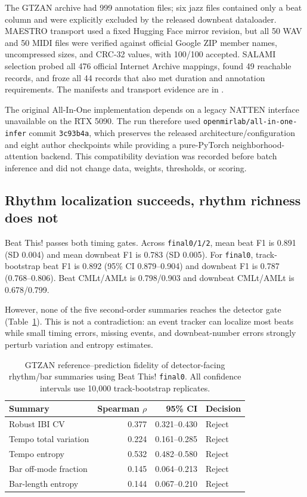 The GTZAN archive had 999 annotation files; six jazz files contained only a beat column and were explicitly excluded by the released downbeat dataloader. MAESTRO transport used a fixed Hugging Face mirror revision, but all 50 WAV and 50 MIDI files were verified against official Google ZIP member names, uncompressed sizes, and CRC-32 values, with 100/100 accepted. SALAMI selection probed all 476 official Internet Archive mappings, found 49 reachable records, and froze all 44 records that also met duration and annotation requirements. The manifests and transport evidence are in .

The original All-In-One implementation depends on a legacy NATTEN interface unavailable on the RTX 5090. The run therefore used \texttt{openmirlab/all-in-one-infer} commit \texttt{3c93b4a}, which preserves the released architecture/configuration and eight author checkpoints while providing a pure-PyTorch neighborhood-attention backend. This compatibility deviation was recorded before batch inference and did not change data, weights, thresholds, or scoring.

\subsection{Rhythm localization succeeds, rhythm richness does not}

Beat This! passes both timing gates. Across \texttt{final0/1/2}, mean beat F1 is 0.891 (SD 0.004) and mean downbeat F1 is 0.783 (SD 0.005). For \texttt{final0}, track-bootstrap beat F1 is 0.892 (95\% CI 0.879--0.904) and downbeat F1 is 0.787 (0.768--0.806). Beat CMLt/AMLt is 0.798/0.903 and downbeat CMLt/AMLt is 0.678/0.799.

However, none of the five second-order summaries reaches the detector gate (Table~\ref{tab:rhythm-feature-fidelity}). This is not a contradiction: an event tracker can localize most beats while small timing errors, missing events, and downbeat-number errors strongly perturb variation and entropy estimates.

\begin{table}[H]
\centering
\caption{GTZAN reference--prediction fidelity of detector-facing rhythm/bar summaries using Beat This! \texttt{final0}. All confidence intervals use 10,000 track-bootstrap replicates.}
\label{tab:rhythm-feature-fidelity}
\begin{tabular}{lrrl}
\toprule
Summary & Spearman $\rho$ & 95\% CI & Decision \\
\midrule
Robust IBI CV & 0.377 & 0.321--0.430 & Reject \\
Tempo total variation & 0.224 & 0.161--0.285 & Reject \\
Tempo entropy & 0.532 & 0.482--0.580 & Reject \\
Bar off-mode fraction & 0.145 & 0.064--0.213 & Reject \\
Bar-length entropy & 0.144 & 0.067--0.210 & Reject \\
\bottomrule
\end{tabular}
\end{table}


